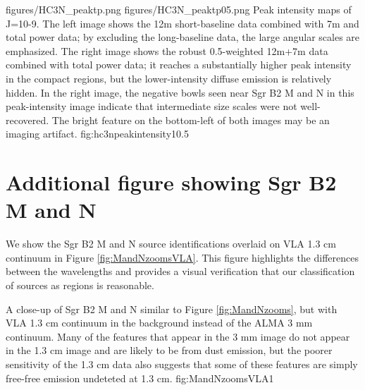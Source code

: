 \documentclass[twocolumn]{aastex61}
\begin{document}
\FigureTwo
{figures/HC3N_peaktp.png}
{figures/HC3N_peaktp05.png}
{Peak intensity maps of \cyanoacetylene J=10-9.
The left image shows the 12m short-baseline data combined with 7m and total
power data; by excluding the long-baseline data, the large angular scales are
emphasized.  The right image shows the robust 0.5-weighted 12m+7m data combined
with total power data;
it reaches a substantially higher peak intensity in the compact regions, but
the lower-intensity diffuse emission is relatively hidden.  In the right image,
the negative bowls seen near Sgr B2 M and N in this peak-intensity image
indicate that intermediate size scales were not well-recovered.  The bright
feature on the bottom-left of both images may be an imaging artifact.}
{fig:hc3npeakintensity}{1}{0.5\textwidth}

\section{Additional figure showing Sgr B2 M and N}
We show the Sgr B2 M and N source identifications overlaid on VLA 1.3 cm
continuum \citep{de-Pree2014a} in Figure \ref{fig:MandNzoomsVLA}.  This figure
highlights the differences between the wavelengths and provides a visual
verification that our classification of sources as \hii regions is reasonable.

{A close-up of Sgr B2 M and N similar to Figure \ref{fig:MandNzooms}, but with
VLA 1.3 cm continuum \citep{de-Pree2014a} in the background instead of the ALMA 3 mm
continuum.  Many of the features that appear in the 3 mm image do not appear
in the 1.3 cm image and are likely to be from dust emission, but the poorer sensitivity
of the 1.3 cm data also suggests that some of these features are simply 
free-free emission undeteted at 1.3 cm.}
{fig:MandNzoomsVLA}{1}{\textwidth}
\end{document}
